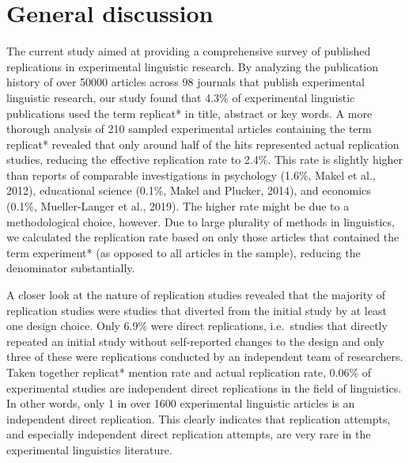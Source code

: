 \documentclass[]{elsarticle} %
\begin{document}
\hypertarget{general-discussion}{%
\section{General discussion}\label{general-discussion}}

The current study aimed at providing a comprehensive survey of published replications in experimental linguistic research.
By analyzing the publication history of over 50000 articles across 98 journals that publish experimental linguistic research, our study found that 4.3\% of experimental linguistic publications used the term replicat* in title, abstract or key words.
A more thorough analysis of 210 sampled experimental articles containing the term replicat* revealed that only around half of the hits represented actual replication studies, reducing the effective replication rate to 2.4\%. This rate is slightly higher than reports of comparable investigations in psychology (1.6\%, Makel et al., 2012), educational science (0.1\%, Makel and Plucker, 2014), and economics (0.1\%, Mueller-Langer et al., 2019). The higher rate might be due to a methodological choice, however. Due to large plurality of methods in linguistics, we calculated the replication rate based on only those articles that contained the term experiment* (as opposed to all articles in the sample), reducing the denominator substantially.

A closer look at the nature of replication studies revealed that the majority of replication studies were studies that diverted from the initial study by at least one design choice. Only 6.9\% were direct replications, i.e.~studies that directly repeated an initial study without self-reported changes to the design and only three of these were replications conducted by an independent team of researchers.
Taken together replicat* mention rate and actual replication rate, 0.06\% of experimental studies are independent direct replications in the field of linguistics. In other words, only 1 in over 1600 experimental linguistic articles is an independent direct replication. This clearly indicates that replication attempts, and especially independent direct replication attempts, are very rare in the experimental linguistics literature.
\end{document}
